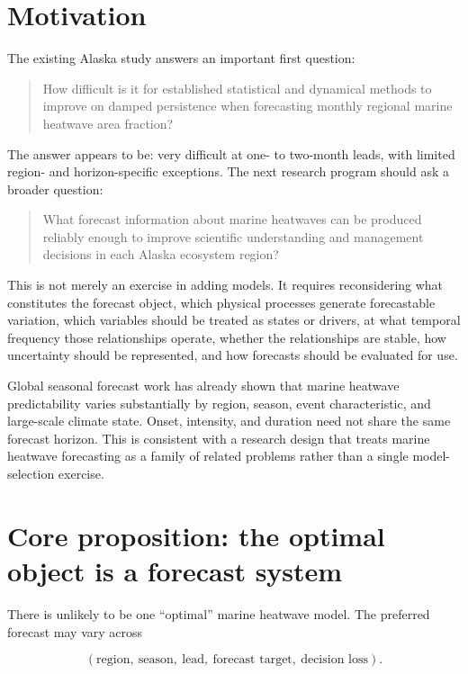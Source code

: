 \documentclass[11pt]{article}
\newcommand{\MHW}{marine heatwave}
\newcommand{\MHWs}{marine heatwaves}
\begin{document}
\section{Motivation}

The existing Alaska study answers an important first question:

\begin{quote}
How difficult is it for established statistical and dynamical methods to improve on damped persistence when forecasting monthly regional \MHW{} area fraction?
\end{quote}

The answer appears to be: very difficult at one- to two-month leads, with limited region- and horizon-specific exceptions. The next research program should ask a broader question:

\begin{quote}
What forecast information about \MHWs{} can be produced reliably enough to improve scientific understanding and management decisions in each Alaska ecosystem region?
\end{quote}

This is not merely an exercise in adding models. It requires reconsidering what constitutes the forecast object, which physical processes generate forecastable variation, which variables should be treated as states or drivers, at what temporal frequency those relationships operate, whether the relationships are stable, how uncertainty should be represented, and how forecasts should be evaluated for use.

Global seasonal forecast work has already shown that \MHW{} predictability varies substantially by region, season, event characteristic, and large-scale climate state. Onset, intensity, and duration need not share the same forecast horizon. This is consistent with a research design that treats \MHW{} forecasting as a family of related problems rather than a single model-selection exercise.

\section{Core proposition: the optimal object is a forecast system}

There is unlikely to be one ``optimal'' \MHW{} model. The preferred forecast may vary across

\begin{equation}
(\text{region},\ \text{season},\ \text{lead},\ \text{forecast target},\ \text{decision loss}).
\end{equation}
\end{document}
